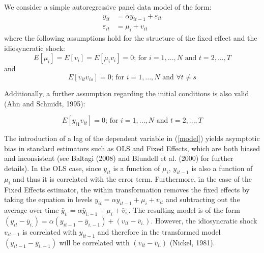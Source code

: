 \documentclass[11pt]{amsart}
\begin{document}
We consider a simple autoregressive panel data model of the form:
\begin{equation}
\label{modelar}
\tag{1'}
\begin{aligned}
y_{it}&=\alpha y_{it-1} + \varepsilon_{it}\\
\varepsilon_{it}&=\mu _{i}+v_{it}
\end{aligned}
\end{equation}
where the following assumptions hold for the structure of the fixed effect and the idiosyncratic shock:
\begin{equation}
\label{as1}
\tag{2'}
E\left[\mu_{i}\right]=E\left[v_{i}\right]=E\left[\mu_{i}v_i\right]=0\text{; for $i=1,...,N$ and $t=2,...,T$}
\end{equation}
and
\begin{equation}
\label{as2}
\tag{3'}
E\left[v_{it}v_{is}\right]=0\text{; for $i=1,...,N$ and $\forall t\neq s$}
\end{equation}

Additionally, a further assumption regarding the initial conditions is also valid (Ahn and Schmidt, 1995):

\begin{equation}
\label{as3}
\tag{4'}
E\left[y_{i1}v_{it}\right]=0\text{; for $i=1,...,N$ and $t=2,...,T$}
\end{equation}

The introduction of a lag of the dependent variable in (\ref{model}) yields asymptotic bias in standard estimators such as OLS and Fixed Effects, which are both biased and inconsistent (see Baltagi (2008) and Blundell et al. (2000) for further details). In the OLS case, since $y_{it}$ is a function of $\mu_{i}$, $y_{it-1}$ is also a function of $\mu_{i}$ and thus it is correlated with the error term. Furthermore, in the case of the Fixed Effects estimator, the within transformation removes the fixed effects by taking the equation in levels $y_{it}=\alpha y_{it-1} + \mu_i+v_{it}$ and subtracting out the average over time $\bar y_{i.}=\alpha \bar y_{i.-1} +\mu_i +\bar v_{i.}$. The resulting model is of the form $(y_{it}-\bar y_{i.})=\alpha (y_{it-1}-\bar y_{i.-1})+ (v_{it}-\bar v_{i.})$. However, the idiosyncratic shock $v_{it-1}$ is correlated with $y_{it-1}$ and therefore in the transformed model $(y_{it-1}-\bar y_{i.-1})$ will be correlated with $(v_{it}-\bar v_{i.})$ (Nickel, 1981).
\end{document}
